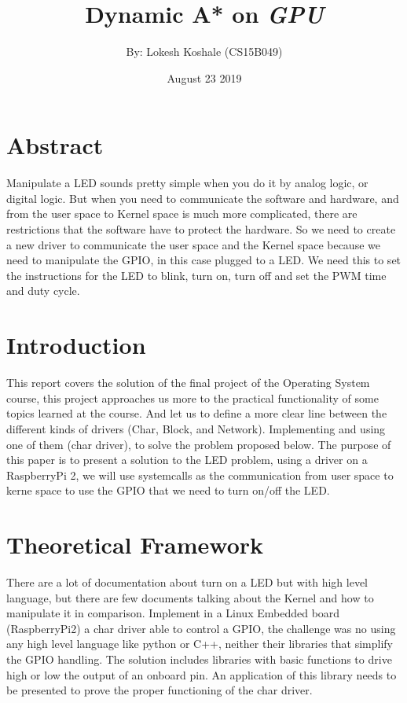 \documentclass[a4paper]{article}
\title{Dynamic A* on \emph{GPU}}
\author{\normalsize By: Lokesh Koshale (CS15B049) \\\normalsize}
\date{\color{black}August 23 2019}
\begin{document}
 \maketitle

\section{Abstract}
Manipulate a LED sounds pretty simple when you do it by analog logic, or digital logic. But when you need to communicate the software and hardware, and from the user space to Kernel space is much more complicated, there are restrictions that the software have to protect the hardware. So we need to create a new driver to communicate the user space and the Kernel space because we need to manipulate the GPIO, in this case plugged to a LED. We need this to set the instructions for the LED to blink, turn on, turn off and set the PWM time and duty cycle.

\section{Introduction}
This report covers the solution of the final project of the Operating System course, this project approaches us more to the practical functionality of some topics learned at the course. And let us to define a more clear line between the different kinds of drivers (Char, Block, and Network). Implementing and using one of them (char driver), to solve the problem proposed below.
The purpose of this paper is to present a solution to the LED problem, using a driver on a RaspberryPi 2, we will use systemcalls as the communication from user space to kerne space to use the GPIO that we need to turn on/off the LED.

\section{Theoretical Framework}

There are a lot of documentation about turn on a LED but with high level language, but there are few documents talking about the Kernel and how to manipulate it in comparison.
Implement in a Linux Embedded board (RaspberryPi2) a char driver able to control a GPIO, the challenge was no using any high level language like python or C++, neither their libraries that simplify the GPIO handling. The solution includes libraries with basic functions to drive high or low the output of an onboard pin. An application of this library needs to be presented to prove the proper functioning of the char driver. 
\end{document}
